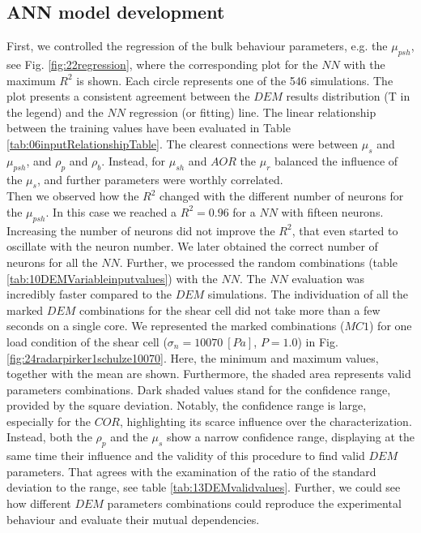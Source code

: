 \subsection{ANN model development}
\label{subsec:annmodeldev}

First, we controlled the regression of the bulk behaviour parameters, e.g. the
$\mu_{psh}$, see Fig. \ref{fig:22regression}, where the corresponding plot for
the $NN$ with the maximum $R^2$ is shown. Each circle represents one of the 546
simulations.
The plot presents a consistent agreement between the $DEM$ results distribution
(T in the legend) and the $NN$ regression (or fitting) line.
The linear relationship between the
training values have been evaluated in Table \ref{tab:06inputRelationshipTable}.
The clearest connections were between $\mu_s$ and $\mu_{psh}$, and
$\rho_p$ and $\rho_b$.
Instead, for $\mu_{sh}$ and $AOR$ the $\mu_r$ balanced the influence of the 
$\mu_s$, and further parameters were worthly correlated. \\
Then we observed how the $R^2$ changed with the different number of neurons for the $\mu_{psh}$. 
In this case we reached a $R^2 = 0.96$ for a $NN$ with fifteen neurons. 
Increasing the number of neurons did not improve the $R^2$, that even started to oscillate with the neuron number. 
We later obtained the correct number of neurons for all the $NN$.
Further, we processed the random combinations (table
\ref{tab:10DEMVariableinputvalues}) with the $NN$.
The $NN$ evaluation was incredibly faster compared to the $DEM$ simulations. The
individuation of all the marked $DEM$ combinations for the shear cell did not
take more than a few seconds on a single core.
We represented the marked combinations ($MC1$) for one load condition of the
shear cell ($\sigma_n=10070 ~[Pa]$, $P=1.0$) in Fig.
\ref{fig:24radarpirker1schulze10070}.
Here, the minimum and maximum values, together with the mean are shown. 
Furthermore, the shaded area represents valid parameters combinations.
Dark shaded values stand for the confidence range, provided by the square
deviation.
Notably, the confidence range is large, 
especially for the $COR$, highlighting its scarce influence over the characterization. 
Instead, both the $\rho_p$  and the $\mu_s$ show a narrow confidence range, 
displaying at the same time their influence and the validity of this procedure to find valid $DEM$ parameters. 
That agrees with the examination of the ratio of the standard deviation to the
range, see table \ref{tab:13DEMvalidvalues}.
Further, we could see how different $DEM$ parameters
combinations could reproduce the experimental behaviour and evaluate their mutual dependencies. 
